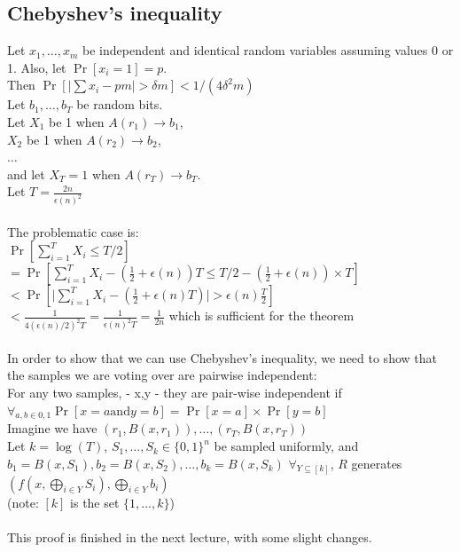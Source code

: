 \documentclass[12pt]{tufte-book}
\begin{document}
\subsection{Chebyshev's inequality} Let $x_1,\ldots,x_m$ be independent and identical random variables assuming values 0 or 1.  Also, let $\Pr[x_i=1] = p$.\\
		Then $\Pr[ \lvert \sum x_i - pm \rvert > \delta m] < 1/(4\delta^2 m)$\\

	Let $b_1,\ldots,b_T$ be random bits.\\
	Let $X_1$ be 1 when $A(r_1) \rightarrow b_1$,\\
	$X_2$ be 1 when $A(r_2) \rightarrow b_2$,\\
	$\ldots$\\
	and let $X_T=1$ when $A(r_T) \rightarrow b_T$.\\
	Let $T=\frac{2n}{\epsilon(n)^2}$\\\\

The problematic case is:\\
	$\Pr[ \sum_{i=1}^T X_i \le T/2]$\\
	$= \Pr[ \sum_{i=1}^T X_i - (\frac{1}{2} + \epsilon(n)) T \le T/2 - (\frac{1}{2}+\epsilon(n))\times T]$\\
	$< \Pr[ \lvert \sum_{i=1}^T X_i - (\frac{1}{2}+\epsilon(n) T)\rvert > \epsilon(n) \frac{T}{2} ]$\\
	$< \frac{1}{4 (\epsilon(n)/2)^2 T} = \frac{1}{\epsilon(n)^2 T} = \frac{1}{2n}$ which is sufficient for the theorem\\\\

In order to show that we can use Chebyshev's inequality, we need to show that the samples we are voting over are pairwise independent:\\
For any two samples, - x,y - they are pair-wise independent if $\forall_{a,b \in {0,1}} \Pr[x=a \text{and} y=b] = \Pr[x=a] \times \Pr[y=b]$\\

	Imagine we have $(r_1, B(x, r_1)), \ldots, (r_T, B(x,r_T))$\\
	Let $k = \log(T)$, $S_1, \ldots, S_k \in \{0,1\}^n$ be sampled uniformly, and $b_1 = B(x, S_1), b_2 = B(x, S_2), \ldots, b_k = B(x, S_k)$
	$\forall_{Y \subseteq [k]}$, $R$ generates $(f(x, \bigoplus_{i \in Y} S_i), \bigoplus_{i \in Y} b_i)$\\
	(note: $[k]$ is the set $\{1,\ldots, k\}$)\\
	\\
	This proof is finished in the next lecture, with some slight changes.
\end{document}
